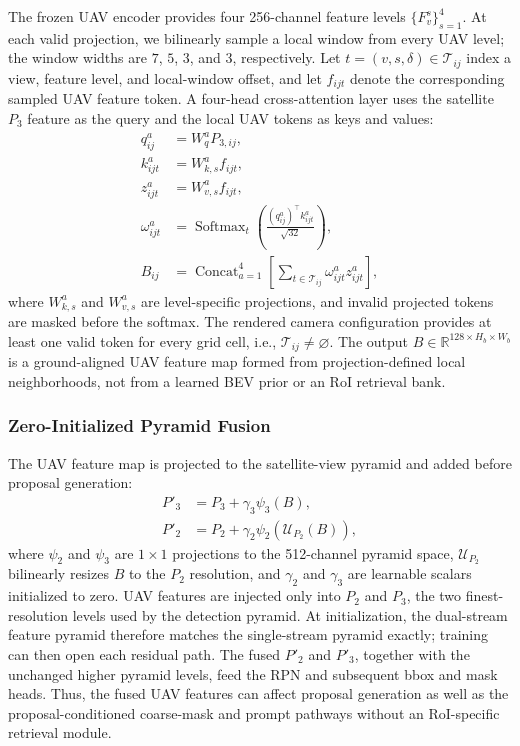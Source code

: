 \documentclass[letterpaper,journal]{IEEEtran}
\begin{document}
The frozen UAV encoder provides four 256-channel feature levels $\{F_v^s\}_{s=1}^{4}$. At each
valid projection, we bilinearly sample a local window from every UAV level; the window widths
are $7$, $5$, $3$, and $3$, respectively. Let $t=(v,s,\delta)\in\mathcal{T}_{ij}$ index a view,
feature level, and local-window offset, and let $f_{ijt}$ denote the corresponding sampled UAV
feature token. A four-head cross-attention layer uses the satellite $P_3$ feature as the query
and the local UAV tokens as keys and values:
\begin{equation}
\begin{aligned}
q^a_{ij}&=W_q^aP_{3,ij},\\
k^a_{ijt}&=W_{k,s}^af_{ijt},\\
z^a_{ijt}&=W_{v,s}^af_{ijt},\\
\omega^a_{ijt}&=\operatorname{Softmax}_{t}\!\left(
\frac{(q^a_{ij})^{\top}k^a_{ijt}}{\sqrt{32}}\right),\\
B_{ij}&=\operatorname{Concat}_{a=1}^{4}\!\left[
\sum_{t\in\mathcal{T}_{ij}}\omega^a_{ijt}z^a_{ijt}\right],
\end{aligned}
\label{eq:local_uav_attention}
\end{equation}
where $W_{k,s}^a$ and $W_{v,s}^a$ are level-specific projections, and invalid projected tokens
are masked before the softmax. The rendered camera configuration provides at least one valid
token for every grid cell, i.e., $\mathcal{T}_{ij}\neq\varnothing$. The output
$B\in\mathbb{R}^{128\times H_b\times W_b}$ is a ground-aligned UAV feature map formed from
projection-defined local neighborhoods, not from a learned BEV prior or an RoI retrieval bank.

\subsubsection{Zero-Initialized Pyramid Fusion}
The UAV feature map is projected to the satellite-view pyramid and added before proposal
generation:
\begin{equation}
\begin{aligned}
P'_3&=P_3+\gamma_3\psi_3(B),\\
P'_2&=P_2+\gamma_2\psi_2\!\left(\mathcal{U}_{P_2}(B)\right),
\end{aligned}
\label{eq:dual_residual}
\end{equation}
where $\psi_2$ and $\psi_3$ are $1\times1$ projections to the 512-channel pyramid space,
$\mathcal{U}_{P_2}$ bilinearly resizes $B$ to the $P_2$ resolution, and $\gamma_2$ and
$\gamma_3$ are learnable scalars initialized to zero. UAV features are injected only into $P_2$
and $P_3$, the two finest-resolution levels used by the detection pyramid. At initialization,
the dual-stream feature pyramid therefore matches the single-stream pyramid exactly; training
can then open each residual path. The fused $P'_2$ and $P'_3$, together with the unchanged
higher pyramid levels, feed the RPN and subsequent bbox and mask heads. Thus, the fused UAV
features can affect proposal generation as well as the proposal-conditioned coarse-mask and
prompt pathways without an RoI-specific retrieval module.
\end{document}
